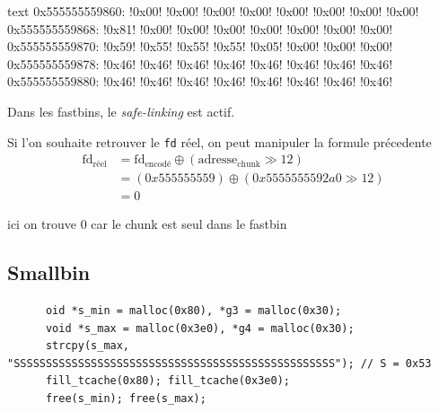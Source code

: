 \begin{pwndbg}[x/40bx f\_max - 0x10]{text}
      0x555555559860: !\textcolor{pwndbgbrown}{0x00}! !\textcolor{pwndbgbrown}{0x00}! !\textcolor{pwndbgbrown}{0x00}! !\textcolor{pwndbgbrown}{0x00}! !\textcolor{pwndbgbrown}{0x00}! !\textcolor{pwndbgbrown}{0x00}! !\textcolor{pwndbgbrown}{0x00}! !\textcolor{pwndbgbrown}{0x00}!
      0x555555559868: !\textcolor{pwndbgred}{0x81}! !\textcolor{pwndbgred}{0x00}! !\textcolor{pwndbgred}{0x00}! !\textcolor{pwndbgred}{0x00}! !\textcolor{pwndbgred}{0x00}! !\textcolor{pwndbgred}{0x00}! !\textcolor{pwndbgred}{0x00}! !\textcolor{pwndbgred}{0x00}!
      0x555555559870: !\textcolor{pwndbgblue}{0x59}! !\textcolor{pwndbgblue}{0x55}! !\textcolor{pwndbgblue}{0x55}! !\textcolor{pwndbgblue}{0x55}! !\textcolor{pwndbgblue}{0x05}! !\textcolor{pwndbgblue}{0x00}! !\textcolor{pwndbgblue}{0x00}! !\textcolor{pwndbgblue}{0x00}!
      0x555555559878: !\textcolor{pwndbgdarkgreen}{0x46}! !\textcolor{pwndbgdarkgreen}{0x46}! !\textcolor{pwndbgdarkgreen}{0x46}! !\textcolor{pwndbgdarkgreen}{0x46}! !\textcolor{pwndbgdarkgreen}{0x46}! !\textcolor{pwndbgdarkgreen}{0x46}! !\textcolor{pwndbgdarkgreen}{0x46}! !\textcolor{pwndbgdarkgreen}{0x46}!
      0x555555559880: !\textcolor{pwndbgdarkgreen}{0x46}! !\textcolor{pwndbgdarkgreen}{0x46}! !\textcolor{pwndbgdarkgreen}{0x46}! !\textcolor{pwndbgdarkgreen}{0x46}! !\textcolor{pwndbgdarkgreen}{0x46}! !\textcolor{pwndbgdarkgreen}{0x46}! !\textcolor{pwndbgdarkgreen}{0x46}! !\textcolor{pwndbgdarkgreen}{0x46}!
\end{pwndbg}

Dans les fastbins, le \textit{safe-linking} est actif.

Si l'on souhaite retrouver le \texttt{fd} réel, on peut manipuler la formule précedente
$$
      \begin{aligned}
            \text{fd}_{\text{réel}} & = \text{fd}_{\text{encodé}} \oplus (\text{adresse}_{\text{chunk}} \gg 12) \\
                                    & = (0x555555559) \oplus (0x5555555592a0 \gg 12)                            \\
                                    & = 0
      \end{aligned}
$$

ici on trouve 0 car le chunk est seul dans le fastbin


\subsection{Smallbin}
\begin{verbatim}
      oid *s_min = malloc(0x80), *g3 = malloc(0x30);
      void *s_max = malloc(0x3e0), *g4 = malloc(0x30);
      strcpy(s_max, "SSSSSSSSSSSSSSSSSSSSSSSSSSSSSSSSSSSSSSSSSSSSSSSSSS"); // S = 0x53
      fill_tcache(0x80); fill_tcache(0x3e0);
      free(s_min); free(s_max);
\end{verbatim}


